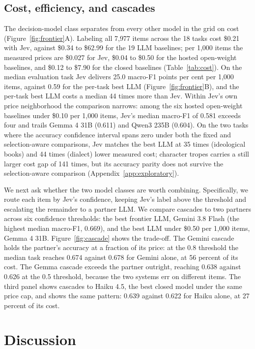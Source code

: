 \documentclass[11pt]{article}
\begin{document}
\subsection{Cost, efficiency, and cascades}
\label{sec:cascades}

The decision-model class separates from every other model in the grid on cost (Figure~\ref{fig:frontier}A). Labeling all 7{,}977 items across the 18 tasks cost \$0.21 with Jev, against \$0.34 to \$62.99 for the 19 LLM baselines; per 1{,}000 items the measured prices are \$0.027 for Jev, \$0.04 to \$0.50 for the hosted open-weight baselines, and \$0.12 to \$7.90 for the closed baselines (Table~\ref{tab:cost}). On the median evaluation task Jev delivers 25.0 macro-F1 points per cent per 1{,}000 items, against 0.59 for the per-task best LLM (Figure~\ref{fig:frontier}B), and the per-task best LLM costs a median 44 times more than Jev. Within Jev's own price neighborhood the comparison narrows: among the six hosted open-weight baselines under \$0.10 per 1{,}000 items, Jev's median macro-F1 of 0.581 exceeds four and trails Gemma 4 31B (0.611) and Qwen3 235B (0.604). On the two tasks where the accuracy confidence interval spans zero under both the fixed and selection-aware comparisons, Jev matches the best LLM at 35 times (ideological books) and 44 times (dialect) lower measured cost; character tropes carries a still larger cost gap of 141 times, but its accuracy parity does not survive the selection-aware comparison (Appendix~\ref{app:exploratory}).

We next ask whether the two model classes are worth combining. Specifically, we route each item by Jev's confidence, keeping Jev's label above the threshold and escalating the remainder to a partner LLM. We compare cascades to two partners across six confidence thresholds: the best frontier LLM, Gemini 3.8 Flash (the highest median macro-F1, 0.669), and the best LLM under \$0.50 per 1{,}000 items, Gemma 4 31B. Figure~\ref{fig:cascade} shows the trade-off. The Gemini cascade holds the partner's accuracy at a fraction of its price: at the 0.8 threshold the median task reaches 0.674 against 0.678 for Gemini alone, at 56 percent of its cost. The Gemma cascade exceeds the partner outright, reaching 0.638 against 0.626 at the 0.5 threshold, because the two systems err on different items. The third panel shows cascades to Haiku 4.5, the best closed model under the same price cap, and shows the same pattern: 0.639 against 0.622 for Haiku alone, at 27 percent of its cost.

\section{Discussion}
\end{document}
